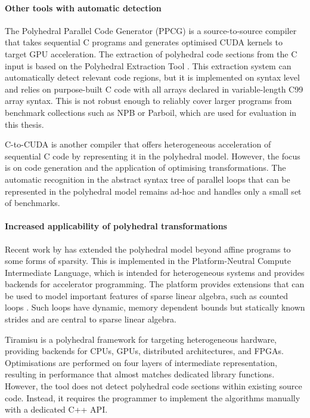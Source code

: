    \paragraph*{Other tools with automatic detection}
    The Polyhedral Parallel Code Generator (PPCG)
    \citep{Verdoolaege:2013:PPC:2400682.2400713} is a source-to-source compiler
    that takes sequential C programs and generates optimised CUDA kernels to
    target GPU acceleration.
    The extraction of polyhedral code sections from the C input is based on the
    Polyhedral Extraction Tool \citep{Verdoolaege12polyhedralextraction}.
    This extraction system can automatically detect relevant code regions, but
    it is implemented on syntax level and relies on purpose-built C code with
    all arrays declared in variable-length C99 array syntax.
    This is not robust enough to reliably cover larger programs from benchmark
    collections such as NPB or Parboil, which are used for evaluation in this
    thesis.

    C-to-CUDA \citep{Baskaran:2010:ACC:2175462.2175482} is another compiler that
    offers heterogeneous acceleration of sequential C code by representing it in
    the polyhedral model.
    However, the focus is on code generation and the application of optimising
    transformations.
    The automatic recognition in the abstract syntax tree of parallel loops that
    can be represented in the polyhedral model remains ad-hoc and handles only a
    small set of benchmarks.

    \paragraph*{Increased applicability of polyhedral transformations}
    Recent work by \citet{baghdadi2015PENCIL} has extended the polyhedral model
    beyond affine programs to some forms of sparsity.
    This is implemented in the Platform-Neutral Compute Intermediate Language,
    which is intended for heterogeneous systems and provides backends for
    accelerator programming.
    The platform provides extensions that can be used to model important
    features of sparse linear algebra, such as counted loops
    \citep{Zhao:2018:PCF:3178372.3179509}.
    Such loops have dynamic, memory dependent bounds but statically known
    strides and are central to sparse linear algebra.

    Tiramisu \citep{Baghdadi:2019:TPC:3314872.3314896} is a polyhedral framework
    for targeting heterogeneous hardware, providing backends for CPUs, GPUs,
    distributed architectures, and FPGAs.
    Optimisations are performed on four layers of intermediate representation,
    resulting in performance that almost matches dedicated library functions.
    However, the tool does not detect polyhedral code sections within existing
    source code.
    Instead, it requires the programmer to implement the algorithms manually
    with a dedicated C++ API.

